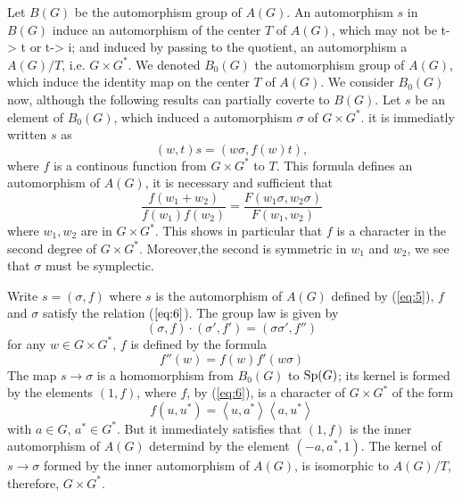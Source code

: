 \documentclass[12pt]{amsart}
\def\inn#1#2{\left\langle{#1},{#2}\right\rangle}
\def\Sp{{\rm Sp}}
\newcounter{ssection}
\renewcommand{\subsection}{
  \addtocounter{ssection}{1}{\bf  \arabic{ssection}.\  }}
\begin{document}
\subsection{}
Let $B(G)$ be the automorphism group of $A(G)$. 
An automorphism $s$ in  $B(G)$ induce an automorphism of the center $T$ of 
 $A(G)$, which may not be t-> t or t-> i; 
and induced by passing to the quotient, an automorphism a $A(G)/T$, i.e. 
$G\times G^*$. We denoted $B_0(G)$ the automorphism group of $A(G)$, 
which induce the identity map on the center $T$ of $A(G)$.
We  consider $B_0(G)$ now, although the following results can partially 
coverte to $B(G)$. Let $s$ be an element of $B_0(G)$, which induced a 
automorphism $\sigma$ of $G\times G^*$. it is immediatly written $s$ as
\begin{equation}\label{eq:5}
(w,t)s = (w\sigma, f(w)t),
\end{equation}
where $f$ is a continous function from $G\times G^*$ to $T$. 
This formula defines an automorphism of $A(G)$, it is necessary and sufficient 
that
\begin{equation}\label{eq:6}
\frac{f(w_1+w_2)}{f(w_1)f(w_2)}=\frac{F(w_1\sigma, w_2\sigma)}{F(w_1,w_2)}
\end{equation}
where $w_1,w_2$ are in $G\times G^*$.
This shows in particular that $f$ 
is a character in the second degree of $G\times G^*$. 
Moreover,the second is symmetric in $w_1$ and $w_2$,
 we see that $\sigma$ must be symplectic.

Write $s = (\sigma, f)$ where $s$ is the automorphism of $A(G)$ defined by 
(\ref{eq:5}), $f$ and $\sigma$ satisfy the relation ($\ref{eq:6}$).
The group law is given by 
\[
(\sigma, f)\cdot(\sigma',f') = (\sigma\sigma', f'')
\]
for any $w\in G\times G^*$, $f$ is defined by the formula
\begin{equation}\label{eq:7}
f''(w)=f(w)f'(w\sigma)
\end{equation}
The map $s\to \sigma$ is a homomorphism from $B_0(G)$ to $\Sp(G)$;
its kernel is formed by  the elements $(1,f)$, where $f$, by (\ref{eq:6}),
is a character of $G\times G^*$ of the form 
\[
f(u,u^*) = \inn{u}{a^*}\inn{a}{u^*}
\]
with $a\in G$, $a^*\in G^*$. 	 	
But it immediately satisfies that $(1,f)$ is the inner
 automorphism of $A(G)$ determind by the element $(-a, a^*, 1)$. 
The kernel of $s\to \sigma$ formed by the inner automorphism of $A(G)$,
is isomorphic to $A(G)/T$, therefore, $G\times G^*$.
\end{document}
